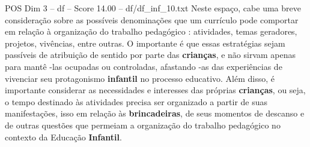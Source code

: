 \begin{textsample}{POS Dim 3 – df – Score 14.00 – df/df\_inf\_10.txt}
Neste espaço, cabe uma breve consideração sobre as possíveis denominações que um currículo pode comportar em relação à organização do trabalho pedagógico : atividades, temas geradores, projetos, vivências, entre outras.
O importante é que essas estratégias sejam passíveis de atribuição de sentido por parte das \textbf{crianças}, e não sirvam apenas para mantê -las ocupadas ou controladas, afastando -as das experiências de vivenciar seu protagonismo \textbf{infantil} no processo educativo.
Além disso, é importante considerar as necessidades e interesses das próprias \textbf{crianças}, ou seja, o tempo destinado às atividades precisa ser organizado a partir de suas manifestações, isso em relação às \textbf{brincadeiras}, de seus momentos de descanso e de outras questões que permeiam a organização do trabalho pedagógico no contexto da Educação \textbf{Infantil}.

\end{textsample}
